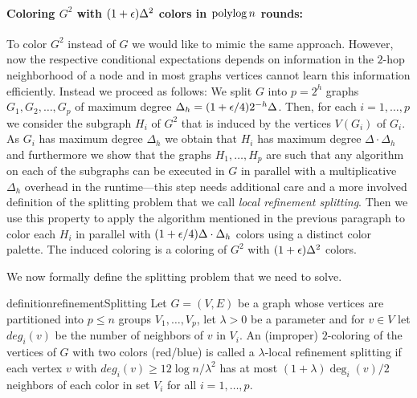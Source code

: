 \paragraph{Coloring $G^2$ with $(1+\epsilon)\Delta^2$ colors in $\operatorname{polylog} n$ rounds:} To color $G^2$ instead of $G$ we would like  to mimic the same approach. However, now the respective conditional expectations depends on information in the $2$-hop neighborhood of a node and in most graphs vertices cannot learn this information efficiently. Instead we proceed as follows: We split $G$ into $p=2^h$ graphs $G_1,G_2,\ldots,G_p$ of maximum degree $\Delta_h=(1+\epsilon/4)2^{-h}\Delta$. Then, for each $i=1,\ldots, p$ we consider the subgraph $H_i$ of $G^2$ that is induced by the vertices $V(G_i)$ of $G_i$. As $G_i$ has maximum degree $\Delta_h$ we obtain that $H_i$ has maximum degree $\Delta\cdot \Delta_h$ and furthermore we show that the graphs $H_1,\ldots, H_p$ are such that any {\congest} algorithm on each of the subgraphs can be executed in $G$ in parallel with a multiplicative $\Delta_h$ overhead in the runtime---this step needs additional care and a more involved definition of the splitting problem that we call \emph{local refinement splitting}. 
Then we use this property to apply the algorithm mentioned in the previous paragraph to color each $H_i$ in parallel with $(1+\epsilon/4)\Delta\cdot\Delta_h$ colors using a distinct color palette. The induced coloring is a coloring of $G^2$ with $(1+\epsilon)\Delta^2$ colors.

\smallskip
We now formally define the splitting problem that we need to solve. 
\begin{restatable}{definition}{refinementSplitting}
Let $G=(V,E)$ be a graph whose vertices are partitioned into $p\leq n$ groups $V_1,\ldots, V_p$, let $\lambda>0$ be a parameter and for $v\in V$ let $deg_i(v)$ be the number of neighbors of $v$ in $V_i$. An (improper) $2$-coloring of the vertices of $G$ with two colors (red/blue) is called a $\lambda$-local refinement splitting if each vertex $v$ with $deg_i(v)\geq 12\log n/\lambda^2$ has at most $(1+\lambda) \deg_i(v)/2$ neighbors of each color in set $V_i$ for all $i=1,\ldots,p$. 
\end{restatable}

